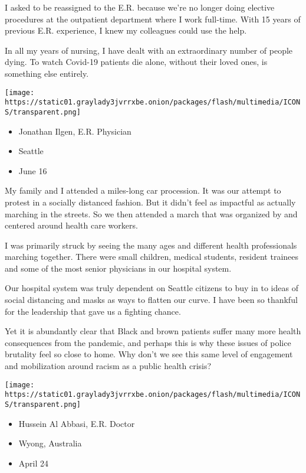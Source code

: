 I asked to be reassigned to the E.R. because we're no longer doing
elective procedures at the outpatient department where I work full-time.
With 15 years of previous E.R. experience, I knew my colleagues could
use the help.

In all my years of nursing, I have dealt with an extraordinary number of
people dying. To watch Covid-19 patients die alone, without their loved
ones, is something else entirely.

\texttt{[image: https://static01.graylady3jvrrxbe.onion/packages/flash/multimedia/ICONS/transparent.png]}

\begin{itemize}
\tightlist
\item
  Jonathan Ilgen, E.R. Physician
\item
  Seattle
\item
  June 16
\end{itemize}

My family and I attended a miles-long car procession. It was our attempt
to protest in a socially distanced fashion. But it didn't feel as
impactful as actually marching in the streets. So we then attended a
march that was organized by and centered around health care workers.

I was primarily struck by seeing the many ages and different health
professionals marching together. There were small children, medical
students, resident trainees and some of the most senior physicians in
our hospital system.

Our hospital system was truly dependent on Seattle citizens to buy in to
ideas of social distancing and masks as ways to flatten our curve. I
have been so thankful for the leadership that gave us a fighting chance.

Yet it is abundantly clear that Black and brown patients suffer many
more health consequences from the pandemic, and perhaps this is why
these issues of police brutality feel so close to home. Why don't we see
this same level of engagement and mobilization around racism as a public
health crisis?

\texttt{[image: https://static01.graylady3jvrrxbe.onion/packages/flash/multimedia/ICONS/transparent.png]}

\begin{itemize}
\tightlist
\item
  Hussein Al Abbasi, E.R. Doctor
\item
  Wyong, Australia
\item
  April 24
\end{itemize}

